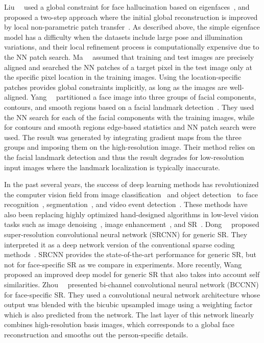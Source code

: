 \documentclass[runningheads]{llncs}
\begin{document}
Liu~\etal~\cite{Liu07} used a global constraint for face hallucination based on eigenfaces~\cite{turk1991eigenfaces}, and proposed a two-step approach where the initial global reconstruction is improved by local non-parametric patch transfer~\cite{freeman2002example}. As described above, the simple eigenface model has a difficulty when the datasets include large pose and illumination variations, and their local refinement process is computationally expensive due to the NN patch search.
Ma~\etal~\cite{Ma10PR} assumed that training and test images are precisely aligned and searched the NN patches of a target pixel in the test image only at the specific pixel location in the training images. Using the location-specific patches provides global constraints implicitly, as long as the images are well-aligned.
Yang~\etal~\cite{Yang13CVPR} partitioned a face image into three groups of facial components, contours, and smooth regions based on a facial landmark detection~\cite{Zhu12CVPR}. They used the NN search for each of the facial components with the training images, while for contours and smooth regions edge-based statistics and NN patch search were used. The result was generated by integrating gradient maps from the three groups and imposing them on the high-resolution image. Their method relies on the facial landmark detection and thus the result degrades for low-resolution input images where the landmark localization is typically inaccurate.


In the past several years, the success of deep learning methods has revolutionized the computer vision field from image classification~\cite{krizhevsky2012imagenet,simonyan2014very} and object detection~\cite{girshick2014rich} to face recognition~\cite{taigman2014deepface}, segmentation~\cite{farabet2013learning}, and video event detection~\cite{simonyan2014two}. These methods have also been replacing highly optimized hand-designed algorithms in low-level vision tasks such as image denoising~\cite{burger2012image,agostinelli2013adaptive,jain2009natural}, image enhancement~\cite{xie2012image,xu2014deep}, and SR~\cite{Dong15PAMI,wang2015self,Zhou15AAAI}.
Dong~\etal~\cite{Dong15PAMI} proposed super-resolution convolutional neural network (SRCNN) for generic SR. They interpreted it as a deep network version of the conventional sparse coding methods~\cite{yang2010image}. SRCNN provides the state-of-the-art performance for generic SR, but not for face-specific SR as we compare in experiments. More recently, Wang~\etal~\cite{wang2015self} proposed an improved deep model for generic SR that also takes into account self similarities.
Zhou~\etal~\cite{Zhou15AAAI} presented bi-channel convolutional neural network (BCCNN) for face-specific SR. They used a convolutional neural network architecture whose output was blended with the bicubic upsampled image using a weighting factor which is also predicted from the network.
The last layer of this network linearly combines high-resolution basis images, which corresponds to a global face reconstruction and smooths out the person-specific details.
\end{document}
